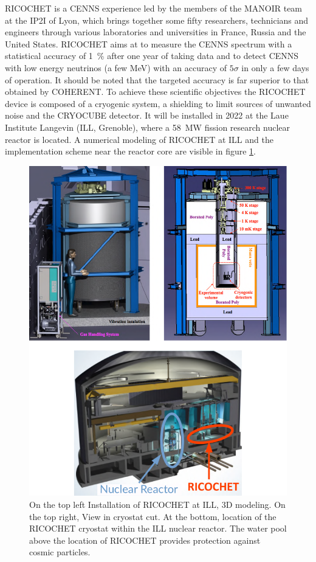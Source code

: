 RICOCHET is a CENNS experience led by the members of the MANOIR team at the IP2I of Lyon, which brings together some fifty researchers, technicians and engineers through various laboratories and universities in France, Russia and the United States. RICOCHET aims at to measure the CENNS spectrum with a statistical accuracy of \SI{1}{\percent} after one year of taking data and to detect CENNS with low energy neutrinos (a few \si{\mega\eV}) with an accuracy of $5\sigma$ in only a few days of operation. 
It should be noted that the targeted accuracy is far superior to that obtained by COHERENT. To achieve these scientific objectives the RICOCHET device is composed of a cryogenic system, a shielding to limit sources of unwanted noise and the CRYOCUBE detector. It will be installed in 2022 at the Laue Institute Langevin (ILL, Grenoble), where a \SI{58}{\mega\watt} fission research nuclear reactor is located. A numerical modeling of RICOCHET at ILL and the implementation scheme near the reactor core are visible in figure \ref{fig:ricochet-ill-site}.

\begin{figure}
\centering
\includegraphics[scale=1]{Figures/Introduction/ricochet_ill_site.pdf}
\caption{On the top left Installation of RICOCHET at ILL, 3D modeling. On the top right, View in
cryostat cut. At the bottom, location of the RICOCHET cryostat within the ILL nuclear reactor. The water pool above the location of RICOCHET provides protection against cosmic particles.}
\label{fig:ricochet-ill-site}
\end{figure}

